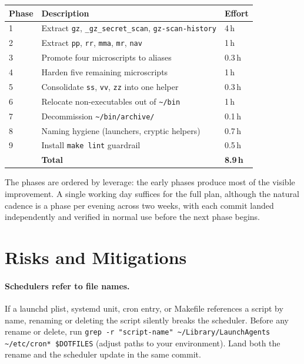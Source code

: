 \documentclass[11pt,letterpaper]{scrartcl}
\begin{document}
\begin{longtable}{@{}lll@{}}
  \toprule
  \textbf{Phase} & \textbf{Description}                                  & \textbf{Effort} \\
  \midrule
  1 & Extract \texttt{gz}, \texttt{\_gz\_secret\_scan}, \texttt{gz-scan-history} & 4\,h            \\
  2 & Extract \texttt{pp}, \texttt{rr}, \texttt{mma}, \texttt{mr}, \texttt{nav}  & 1\,h            \\
  3 & Promote four microscripts to aliases                                       & 0.3\,h          \\
  4 & Harden five remaining microscripts                                         & 1\,h            \\
  5 & Consolidate \texttt{ss}, \texttt{vv}, \texttt{zz} into one helper          & 0.3\,h          \\
  6 & Relocate non-executables out of \texttt{\textasciitilde/bin}               & 1\,h            \\
  7 & Decommission \texttt{\textasciitilde/bin/archive/}                         & 0.1\,h          \\
  8 & Naming hygiene (launchers, cryptic helpers)                                & 0.7\,h          \\
  9 & Install \texttt{make lint} guardrail                                       & 0.5\,h          \\
  \midrule
    & \textbf{Total}                                                             & \textbf{8.9\,h} \\
  \bottomrule
\end{longtable}

The phases are ordered by leverage: the early phases produce most
of the visible improvement. A single working day suffices for the
full plan, although the natural cadence is a phase per evening
across two weeks, with each commit landed independently and
verified in normal use before the next phase begins.

\section{Risks and Mitigations}

\paragraph{Schedulers refer to file names.}
If a launchd plist, systemd unit, cron entry, or Makefile
references a script by name, renaming or deleting the script
silently breaks the scheduler. Before any rename or delete, run
\texttt{grep -r "script-name" \textasciitilde/Library/LaunchAgents
\textasciitilde/etc/cron* \$DOTFILES} (adjust paths to your
environment). Land both the rename and the scheduler update in
the same commit.
\end{document}
